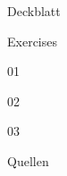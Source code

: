 \documentclass[11pt]{scrreprt}
\begin{document}
\setcounter{page}{1}   %

{Deckblatt}

\setcounter{chapter}{0} 
\tableofcontents %
\pagebreak

{Exercises}%





{01}

{02}

{03}



{Quellen}

 
\end{document}
